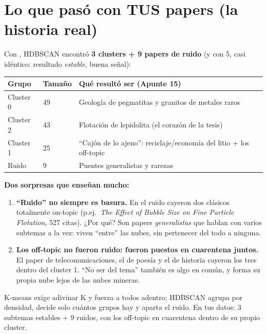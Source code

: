 \documentclass[11pt,a4paper]{article}
\begin{document}
\section{Lo que pasó con TUS papers (la historia real)}

Con , HDBSCAN encontró \textbf{3 clusters + 9 papers de ruido}
(y con 5, casi idéntico: resultado \emph{estable}, buena señal):

\begin{center}
\begin{tabular}{llp{6.6cm}}
\textbf{Grupo} & \textbf{Tamaño} & \textbf{Qué resultó ser (Apunte 15)} \\
\hline
Cluster 0 & 49 & Geología de pegmatitas y granitos de metales raros \\
Cluster 2 & 43 & Flotación de lepidolita (el corazón de la tesis) \\
Cluster 1 & 25 & ``Cajón de lo ajeno'': reciclaje/economía del litio + los off-topic \\
Ruido & 9 & Puentes generalistas y rarezas \\
\end{tabular}
\end{center}

\begin{ojo}
\textbf{Dos sorpresas que enseñan mucho:}
\begin{enumerate}
  \item \textbf{``Ruido'' no siempre es basura.} En el ruido cayeron dos clásicos totalmente
        on-topic (p.ej.\ \emph{The Effect of Bubble Size on Fine Particle Flotation}, 527
        citas). ¿Por qué? Son papers \emph{generalistas} que hablan con varios subtemas a la
        vez: viven ``entre'' las nubes, sin pertenecer del todo a ninguna.
  \item \textbf{Los off-topic no fueron ruido: fueron puestos en cuarentena juntos.} El paper
        de telecomunicaciones, el de poesía y el de historia cayeron los tres dentro del
        cluster 1. ``No ser del tema'' también es algo en común, y forma su propia nube lejos
        de las nubes mineras.
\end{enumerate}
\end{ojo}

\begin{resumen}
K-means exige adivinar K y fuerza a todos adentro; HDBSCAN agrupa por densidad, decide solo
cuántos grupos hay y aparta el ruido. En tus datos: 3 subtemas estables + 9 ruidos, con los
off-topic en cuarentena dentro de su propio cluster.
\end{resumen}
\end{document}
